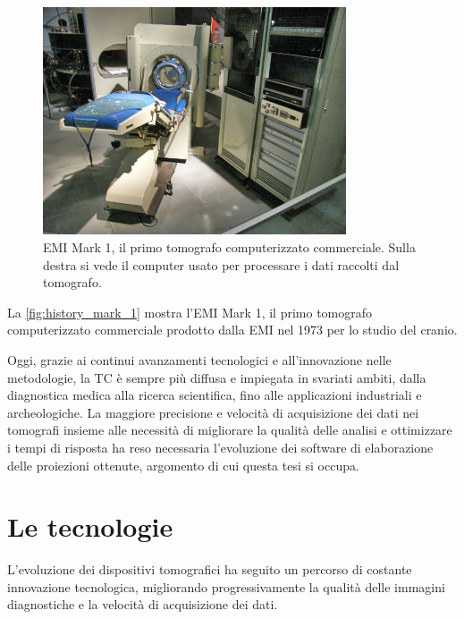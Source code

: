 \documentclass[12pt,a4paper]{report}
\begin{document}
\begin{figure}[H]
  \centering
  \includegraphics[width=0.8\textwidth]{scanner-Mark-I}
  \caption{\label{fig:history_mark_1} EMI Mark 1, il primo tomografo computerizzato commerciale.
           Sulla destra si vede il computer usato per processare i dati raccolti dal tomografo.}
\end{figure}

La \autoref{fig:history_mark_1} mostra l'EMI Mark 1, il primo tomografo computerizzato commerciale prodotto dalla EMI nel 1973
per lo studio del cranio.

Oggi, grazie ai continui avanzamenti tecnologici e all'innovazione nelle metodologie, la TC è sempre più diffusa e impiegata in
svariati ambiti, dalla diagnostica medica alla ricerca scientifica, fino alle applicazioni industriali e archeologiche.
La maggiore precisione e velocità di acquisizione dei dati nei tomografi insieme alle necessità di migliorare la qualità delle
analisi e ottimizzare i tempi di risposta ha reso necessaria l'evoluzione dei software di elaborazione delle proiezioni ottenute,
argomento di cui questa tesi si occupa.

\section{Le tecnologie}

L'evoluzione dei dispositivi tomografici ha seguito un percorso di costante innovazione tecnologica, migliorando progressivamente
la qualità delle immagini diagnostiche e la velocità di acquisizione dei dati.
\end{document}
